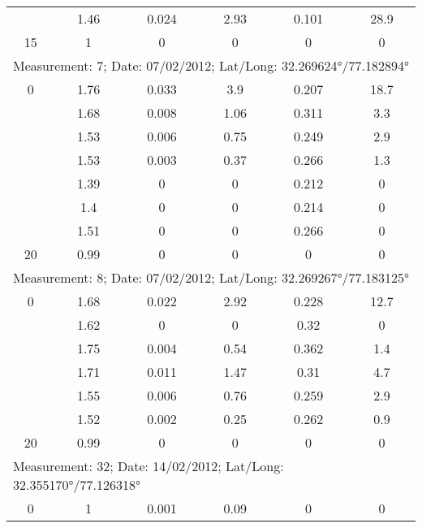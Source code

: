 \begin{longtable}{cccccc}
		& 1.46  & 0.024 & 2.93  & 0.101 & 28.9 \\
		
		15    & 1     & 0     & 0     & 0     & 0 \\
		\midrule
		\multicolumn{6}{l}{Measurement: 7; Date: 07/02/2012;
			Lat/Long: 32.269624°/77.182894°} \\		
		\midrule
		0  & 1.76  & 0.033 & 3.9   & 0.207 & 18.7 \\
		
		& 1.68  & 0.008 & 1.06  & 0.311 & 3.3 \\
		
		& 1.53  & 0.006 & 0.75  & 0.249 & 2.9 \\
		
		& 1.53  & 0.003 & 0.37  & 0.266 & 1.3 \\
		
		& 1.39  & 0     & 0     & 0.212 & 0 \\
		
		& 1.4   & 0     & 0     & 0.214 & 0 \\
		
		& 1.51  & 0     & 0     & 0.266 & 0 \\
		
		20    & 0.99  & 0     & 0     & 0     & 0 \\
		\midrule
		\multicolumn{6}{l}{Measurement: 8; Date: 07/02/2012;
			Lat/Long: 32.269267°/77.183125°} \\		
		\midrule
		0     & 1.68  & 0.022 & 2.92  & 0.228 & 12.7 \\
		
		& 1.62  & 0     & 0     & 0.32  & 0 \\
		
		& 1.75  & 0.004 & 0.54  & 0.362 & 1.4 \\
		
		& 1.71  & 0.011 & 1.47  & 0.31  & 4.7 \\
		
		& 1.55  & 0.006 & 0.76  & 0.259 & 2.9 \\
		
		& 1.52  & 0.002 & 0.25  & 0.262 & 0.9 \\
		
		20    & 0.99  & 0     & 0     & 0     & 0 \\
		\midrule
		\multicolumn{6}{l}{Measurement: 32; Date: 14/02/2012;
			Lat/Long: 32.355170°/77.126318°} \\		
		\midrule		
		0     & 1     & 0.001 & 0.09  & 0     & 0 \\
		

\end{longtable}
